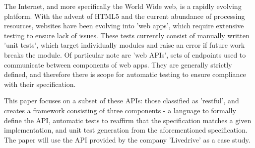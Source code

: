 The Internet, and more specifically the World Wide web, is a rapidly evolving platform. With the advent of HTML5 and the current abundance of processing resources, websites have been evolving into 'web apps', which require extensive testing to ensure lack of issues. These tests currently consist of manually written 'unit tests', which target individually modules and raise an error if future work breaks the module. Of particular note are 'web APIs', sets of endpoints used to communicate between components of web apps. They are generally strictly defined, and therefore there is scope for automatic testing to ensure compliance with their specification.

This paper focuses on a subset of these APIs: those classified as 'restful', and creates a framework consisting of three components - a language to formally define the API, automatic tests to reaffirm that the specification matches a given implementation, and unit test generation from the aforementioned specification. The paper will use the API provided by the company 'Livedrive' as a case study.